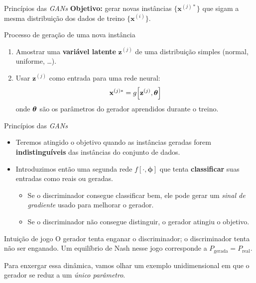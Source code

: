 \documentclass[aspectratio=169,xcolor=dvipsnames]{beamer}
\begin{document}
  \begin{frame}{Princípios das \textit{GANs}}
    \textbf{Objetivo:} gerar novas instâncias
    $\{\mathbf{x}^{(j)*}\}$ que sigam a mesma distribuição dos dados de treino
    $\{\mathbf{x}^{(i)}\}$.
    \vspace{0.5em}
    \begin{block}{Processo de geração de uma nova instância}
      \begin{enumerate}
        \item Amostrar uma \textbf{variável latente}
        $\mathbf{z}^{(j)}$ de uma distribuição simples (normal, uniforme, \ldots).
        \item Usar $\mathbf{z}^{(j)}$ como entrada para uma rede neural:
        \[
          \mathbf{x}^{(j)*} = g\!\left[\mathbf{z}^{(j)}, \bm{\theta}\right]
        \]
        onde $\bm{\theta}$ são os parâmetros do gerador aprendidos durante o
        treino.
      \end{enumerate}
    \end{block}
  \end{frame}

  \begin{frame}{Princípios das \textit{GANs}}
    \begin{itemize}
      \item Teremos atingido o objetivo quando as instâncias geradas
      forem \textbf{indistinguíveis} das instâncias do conjunto de
      dados.
      \item Introduzimos então uma segunda rede
      $f\!\left[\cdot,\bm{\phi}\right]$ que tenta \textbf{classificar} suas
      entradas como reais ou geradas.
      \begin{itemize}
        \item Se o discriminador consegue classificar bem, ele pode
        gerar um \emph{sinal de gradiente} usado para melhorar o
        gerador.
        \item Se o discriminador não consegue distinguir, o gerador
        atingiu o objetivo.
      \end{itemize}
    \end{itemize}
    \begin{alertblock}{Intuição de jogo}
      O gerador tenta enganar o discriminador; o discriminador tenta não
      ser enganado. Um equilíbrio de Nash nesse jogo corresponde a
      $P_{\text{gerada}} = P_{\text{real}}$.
    \end{alertblock}
    \vspace{0.3em}
    Para enxergar essa dinâmica, vamos olhar um exemplo unidimensional
    em que o gerador se reduz a um \emph{único parâmetro}.
  \end{frame}
\end{document}
